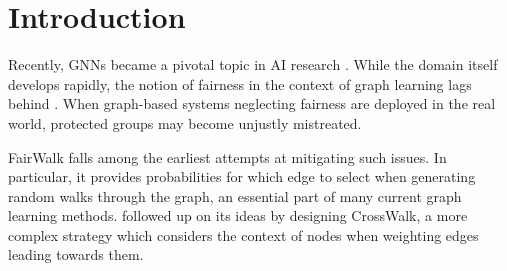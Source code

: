 \def\sectionautorefname{Section}
\def\subsectionautorefname{Subsection}

\doparttoc %
\faketableofcontents %

\section{Introduction}


Recently, \acp{GNN} became a pivotal topic in AI research \citep{Keramatfar2022}. While the domain itself develops rapidly, the notion of fairness in the context of graph learning lags behind \citep{Khajehnejad2022}. When graph-based systems neglecting fairness are deployed in the real world, protected groups may become unjustly mistreated. 



FairWalk \citep{Rahman2019} falls among the earliest attempts at mitigating such issues. In particular, it provides probabilities for which edge to select when generating random walks through the graph, an essential part of many current graph learning methods. \citet{Khajehnejad2022} followed up on its ideas by designing CrossWalk, a more complex strategy which considers the context of nodes when weighting edges leading towards them.

